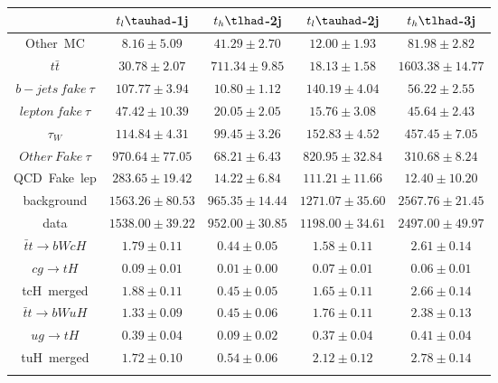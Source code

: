 \centering
\begin{tabular}{ccccc} \toprule\toprule
 & $t_{l}\tauhad$-1j & $t_{h}\tlhad$-2j & $t_{l}\tauhad$-2j & $t_{h}\tlhad$-3j\\\midrule
Other~MC & $8.16\pm5.09$ & $41.29\pm2.70$ & $12.00\pm1.93$ & $81.98\pm2.82$\\
$t\bar{t}$ & $30.78\pm2.07$ & $711.34\pm9.85$ & $18.13\pm1.58$ & $1603.38\pm14.77$\\
$b-jets~fake~\tau$ & $107.77\pm3.94$ & $10.80\pm1.12$ & $140.19\pm4.04$ & $56.22\pm2.55$\\
$lepton~fake~\tau$ & $47.42\pm10.39$ & $20.05\pm2.05$ & $15.76\pm3.08$ & $45.64\pm2.43$\\
$\tau_{W}$ & $114.84\pm4.31$ & $99.45\pm3.26$ & $152.83\pm4.52$ & $457.45\pm7.05$\\
$Other~Fake~\tau$ & $970.64\pm77.05$ & $68.21\pm6.43$ & $820.95\pm32.84$ & $310.68\pm8.24$\\
QCD~Fake~lep & $283.65\pm19.42$ & $14.22\pm6.84$ & $111.21\pm11.66$ & $12.40\pm10.20$\\
background & $1563.26\pm80.53$ & $965.35\pm14.44$ & $1271.07\pm35.60$ & $2567.76\pm21.45$\\
data & $1538.00\pm39.22$ & $952.00\pm30.85$ & $1198.00\pm34.61$ & $2497.00\pm49.97$\\
$\bar{t}t\to bWcH$ & $1.79\pm0.11$ & $0.44\pm0.05$ & $1.58\pm0.11$ & $2.61\pm0.14$\\
$cg\to tH$ & $0.09\pm0.01$ & $0.01\pm0.00$ & $0.07\pm0.01$ & $0.06\pm0.01$\\
tcH~merged & $1.88\pm0.11$ & $0.45\pm0.05$ & $1.65\pm0.11$ & $2.66\pm0.14$\\
$\bar{t}t\to bWuH$ & $1.33\pm0.09$ & $0.45\pm0.06$ & $1.76\pm0.11$ & $2.38\pm0.13$\\
$ug\to tH$ & $0.39\pm0.04$ & $0.09\pm0.02$ & $0.37\pm0.04$ & $0.41\pm0.04$\\
tuH~merged & $1.72\pm0.10$ & $0.54\pm0.06$ & $2.12\pm0.12$ & $2.78\pm0.14$\\
\bottomrule\bottomrule\\
\end{tabular}
